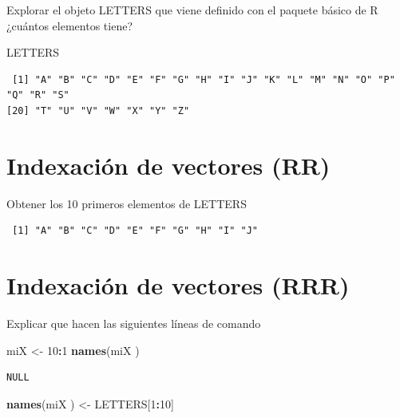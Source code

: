 \documentclass[]{book}
\newenvironment{Shaded}{\begin{snugshade}}{\end{snugshade}}
\newcommand{\DecValTok}[1]{\textcolor[rgb]{0.00,0.00,0.81}{#1}}
\newcommand{\KeywordTok}[1]{\textcolor[rgb]{0.13,0.29,0.53}{\textbf{#1}}}
\newcommand{\NormalTok}[1]{#1}
\newcommand{\OperatorTok}[1]{\textcolor[rgb]{0.81,0.36,0.00}{\textbf{#1}}}
\newcommand{\StringTok}[1]{\textcolor[rgb]{0.31,0.60,0.02}{#1}}
\begin{document}
Explorar el objeto LETTERS que viene definido con el paquete básico de R ¿cuántos elementos tiene?

\begin{Shaded}
\begin{Highlighting}[]
\NormalTok{LETTERS}
\end{Highlighting}
\end{Shaded}

\begin{verbatim}
 [1] "A" "B" "C" "D" "E" "F" "G" "H" "I" "J" "K" "L" "M" "N" "O" "P" "Q" "R" "S"
[20] "T" "U" "V" "W" "X" "Y" "Z"
\end{verbatim}

\hypertarget{indexaciuxf3n-de-vectores-rr}{%
\section{Indexación de vectores (RR)}\label{indexaciuxf3n-de-vectores-rr}}

Obtener los 10 primeros elementos de LETTERS

\begin{verbatim}
 [1] "A" "B" "C" "D" "E" "F" "G" "H" "I" "J"
\end{verbatim}

\hypertarget{indexaciuxf3n-de-vectores-rrr}{%
\section{Indexación de vectores (RRR)}\label{indexaciuxf3n-de-vectores-rrr}}

Explicar que hacen las siguientes líneas de comando

\begin{Shaded}
\begin{Highlighting}[]
\NormalTok{miX <-}\StringTok{ }\DecValTok{10}\OperatorTok{:}\DecValTok{1}
\KeywordTok{names}\NormalTok{(miX )}
\end{Highlighting}
\end{Shaded}

\begin{verbatim}
NULL
\end{verbatim}

\begin{Shaded}
\begin{Highlighting}[]
\KeywordTok{names}\NormalTok{(miX ) <-}\StringTok{ }\NormalTok{LETTERS[}\DecValTok{1}\OperatorTok{:}\DecValTok{10}\NormalTok{]}
\end{Highlighting}
\end{Shaded}
\end{document}

